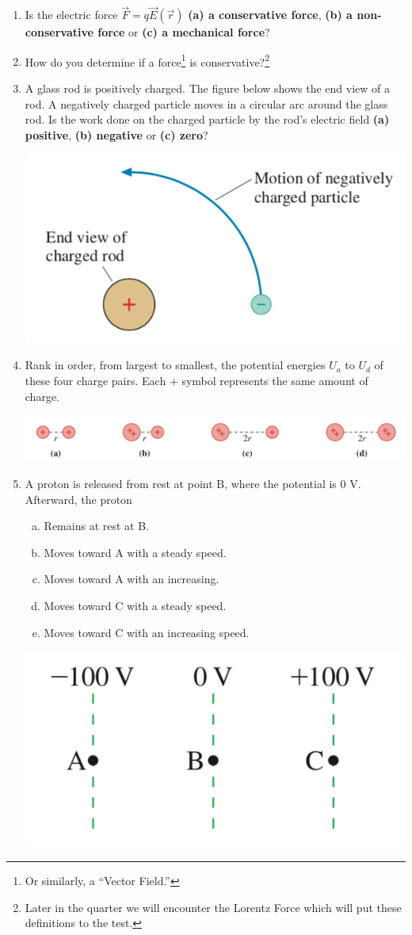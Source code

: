 \documentclass[12pt]{article}
\begin{document}
\begin{enumerate}[(1)]

\item Is the electric force $\vec{F} = q\vec{E}(\vec{r})$ {\bfseries (a) a conservative force}, {\bfseries (b) a non-conservative force} or {\bfseries (c) a mechanical force}?
\item How do you determine if a force\footnote{Or similarly, a ``Vector Field.''} is conservative?\footnote{Later in the quarter we will encounter the Lorentz Force which will put these definitions to the test.}
\item A glass rod is positively charged. The figure below shows the end view of a rod. A negatively charged particle moves in a circular arc around the glass rod. Is the work done on the charged particle by the rod's electric field {\bfseries (a) positive}, {\bfseries(b) negative} or {\bfseries (c) zero}?

\begin{center}
\includegraphics[width=.4\linewidth]{W3-fig1}
\end{center}

\item Rank in order, from largest to smallest, the potential energies $U_a$ to $U_d$ of these four charge pairs. Each $+$ symbol represents the same amount of charge.
\begin{center}
\includegraphics[width=.9\linewidth]{W3-fig2}
\end{center}

{\newpage}

\item A proton is released from rest at point B, where the potential is $0$ V. Afterward, the proton
\begin{enumerate}[(a)]
\item Remains at rest at B.
\item Moves toward A with a steady speed.
\item Moves toward A with an increasing.
\item Moves toward C with a steady speed.
\item Moves toward C with an increasing speed.
\end{enumerate}
\begin{center}
\includegraphics[width=.5\linewidth]{W3-fig3}
\end{center}

\end{enumerate}
\end{document}
